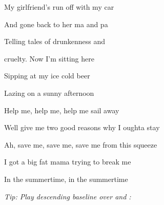 \begin{song}
\bigskip

My girlfriend's run off with my car \par
And gone back to her ma and pa \par
{}Telling tales of drunkenness and \par
{}cruelty. Now I'm sitting here \par
{}Sipping at my ice cold beer \par
{}Lazing on a sunny afternoon \par

\bigskip

Help me, help me, help me sail away \par
Well give me two good reasons why I oughta stay  \par

\bigskip

\Chorus

\bigskip

Ah, save me, save me, save me from this squeeze \par
I got a big fat mama trying to break me  \par

\bigskip

\Chorus

\bigskip

In the summertime, in the summertime \par
{} \par


\vfill

{\smaller\it
Tip: Play descending baseline over  and :
}

\bigskip

\small


\end{song}
